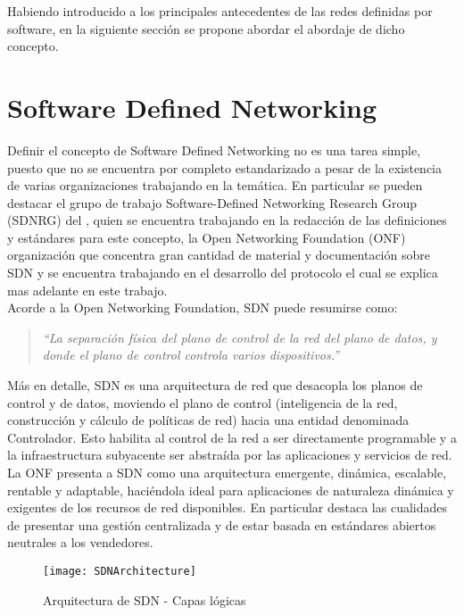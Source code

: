 Habiendo introducido a los principales antecedentes de las redes definidas por software, en la siguiente secci\'on se propone abordar el abordaje de dicho concepto.

\section{Software Defined Networking}
\label{section2.2}

Definir el concepto de Software Defined Networking no es una tarea simple, puesto que no se encuentra por completo estandarizado a pesar de la existencia de varias organizaciones trabajando en la temática. En particular se pueden destacar el grupo de trabajo Software-Defined Networking Research Group (SDNRG) del , quien se encuentra trabajando en la redacción de las definiciones y estándares para este concepto, la Open Networking Foundation (ONF) organización que concentra gran cantidad de material y documentación sobre SDN y se encuentra trabajando en el desarrollo del protocolo  el cual se explica mas adelante en este trabajo.\\

Acorde a la Open Networking Foundation, SDN puede resumirse como:

\begin{quote}
\textit{``La separación física del plano de control de la red del plano de datos, y donde el plano de control controla varios dispositivos.''}
\end{quote}

Más en detalle, SDN es una arquitectura de red que desacopla los planos de control y de datos, moviendo el plano de control (inteligencia de la red, construcción y c\'alculo de políticas de red) hacia una entidad denominada Controlador. Esto habilita al control de la red a ser directamente programable y a la infraestructura subyacente ser abstraída por las aplicaciones y servicios de red.\\ 

La ONF presenta a SDN como una arquitectura emergente, dinámica, escalable, rentable y adaptable, haciéndola ideal para aplicaciones de naturaleza dinámica y exigentes de los recursos de red disponibles. En particular destaca las cualidades de presentar una gestión centralizada y de estar basada en estándares abiertos neutrales a los vendedores.\\

\begin{figure}[htbp!] 
\centering    
\texttt{[image: SDNArchitecture]}
\caption[Arquitectura de SDN - Capas lógicas]{Arquitectura de SDN - Capas lógicas}
\label{fig:SDNArchitecture}
\end{figure}

